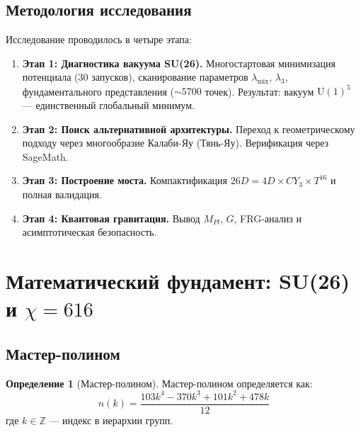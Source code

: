 \documentclass[12pt,a4paper,twoside]{article}
\newcommand{\Uone}{\mathrm{U}(1)}
\theoremstyle{definition}
\newtheorem{definition}{Определение}[section]
\begin{document}
\subsection{Методология исследования}

Исследование проводилось в четыре этапа:

\begin{enumerate}
    \item \textbf{Этап 1: Диагностика вакуума SU(26).} Многостартовая минимизация потенциала (30 запусков), сканирование параметров $\lambda_{\text{mix}}$, $\lambda_3$, фундаментального представления ($\sim 5700$ точек). Результат: вакуум $\Uone^5$ — единственный глобальный минимум.
    
    \item \textbf{Этап 2: Поиск альтернативной архитектуры.} Переход к геометрическому подходу через многообразие Калаби-Яу (Тянь-Яу). Верификация через SageMath.
    
    \item \textbf{Этап 3: Построение моста.} Компактификация $26D = 4D \times CY_3 \times T^{16}$ и полная валидация.
    
    \item \textbf{Этап 4: Квантовая гравитация.} Вывод $M_{Pl}$, $G$, FRG-анализ и асимптотическая безопасность.
\end{enumerate}

\section{Математический фундамент: \texorpdfstring{SU(26) и $\chi = 616$}{SU(26) и chi = 616}}
\label{sec:math}

\subsection{Мастер-полином}

\begin{definition}[Мастер-полином]
Мастер-полином определяется как:
\begin{equation}
\boxed{
n(k) = \frac{103k^4 - 370k^3 + 101k^2 + 478k}{12}
}
\label{eq:master_poly}
\end{equation}
где $k \in \mathbb{Z}$ — индекс в иерархии групп.
\end{definition}
\end{document}
